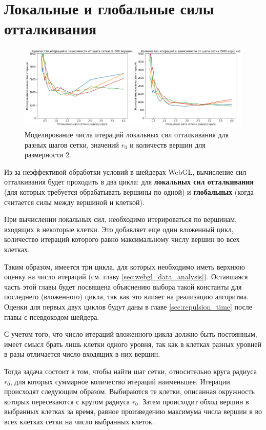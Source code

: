 \section{Локальные и глобальные силы отталкивания}
\label{sec:iter_estimate}

\begin{figure}[t]
  \centering
  \includegraphics[width=\textwidth]{grid_step_2.png}
  \caption{Моделирование числа итераций локальных сил отталкивания для разных шагов сетки, значений $r_0$ и количеств вершин для размерности 2.}
  \label{fig:grid_step}
\end{figure}

Из-за неэффективой обработки условий в шейдерах WebGL, вычисление сил отталкивания будет проходить в два цикла: для {\bfseries локальных сил отталкивания} (для которых требуется обрабатывать вершины по одной) и {\bfseries глобальных} (когда считается силы между вершиной и клеткой).

При вычислении локальных сил, необходимо итерироваться по вершинам, входящих в некоторые клетки. Это добавляет еще один вложенный цикл, количество итераций которого равно максимальному числу вершин во всех клетках.

Таким образом, имеется три цикла, для которых необходимо иметь верхнюю оценку на число итераций (см. главу \ref{sec:webgl_data_analysis}). Оставшаяся часть этой главы будет посвящена объяснению выбора такой константы для последнего (вложенного) цикла, так как это влияет на реализацию алгоритма. Оценки для первых двух циклов будут даны в главе \ref{sec:repulsion_time} после главы с псевдокодом шейдера.

С учетом того, что число итераций вложенного цикла должно быть постоянным, имеет смысл брать лишь клетки одного уровня, так как в клетках разных уровней в разы отличается число входящих в них вершин.

Тогда задача состоит в том, чтобы найти шаг сетки, относительно круга радиуса $r_0$, для которых суммарное количество итераций наименьшее. Итерации происходят следующим образом. Выбираются те клетки, описанная окружность которых пересекаются с кругом радиуса $r_0$. Затем происходит обход вершин в выбранных клетках за время, равное произведению максимума числа вершин в во всех клетках сетки на число выбранных клеток.

